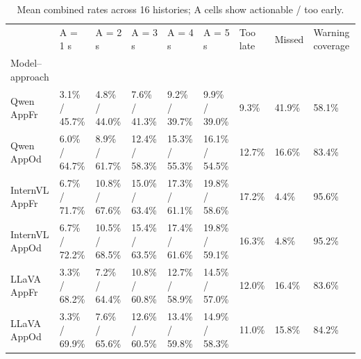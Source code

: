 \begin{table}[tbp]
\caption{Mean combined rates across 16 histories; A cells show actionable / too early.}
\label{tab:rq4-complete-warning-profile}
\begin{tabular}{lllllllll}
\toprule
 & A = 1 s & A = 2 s & A = 3 s & A = 4 s & A = 5 s & Too late & Missed & Warning coverage \\
Model–approach &  &  &  &  &  &  &  &  \\
\midrule
Qwen AppFr & 3.1\% / 45.7\% & 4.8\% / 44.0\% & 7.6\% / 41.3\% & 9.2\% / 39.7\% & 9.9\% / 39.0\% & 9.3\% & 41.9\% & 58.1\% \\
Qwen AppOd & 6.0\% / 64.7\% & 8.9\% / 61.7\% & 12.4\% / 58.3\% & 15.3\% / 55.3\% & 16.1\% / 54.5\% & 12.7\% & 16.6\% & 83.4\% \\
InternVL AppFr & 6.7\% / 71.7\% & 10.8\% / 67.6\% & 15.0\% / 63.4\% & 17.3\% / 61.1\% & 19.8\% / 58.6\% & 17.2\% & 4.4\% & 95.6\% \\
InternVL AppOd & 6.7\% / 72.2\% & 10.5\% / 68.5\% & 15.4\% / 63.5\% & 17.4\% / 61.6\% & 19.8\% / 59.1\% & 16.3\% & 4.8\% & 95.2\% \\
LLaVA AppFr & 3.3\% / 68.2\% & 7.2\% / 64.4\% & 10.8\% / 60.8\% & 12.7\% / 58.9\% & 14.5\% / 57.0\% & 12.0\% & 16.4\% & 83.6\% \\
LLaVA AppOd & 3.3\% / 69.9\% & 7.6\% / 65.6\% & 12.6\% / 60.5\% & 13.4\% / 59.8\% & 14.9\% / 58.3\% & 11.0\% & 15.8\% & 84.2\% \\
\bottomrule
\end{tabular}
\end{table}
